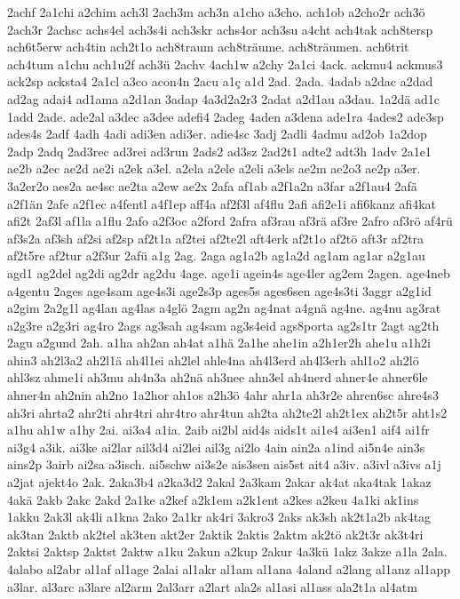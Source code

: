 {2achf
2a1chi
a2chim
ach3l
2ach3m
ach3n
a1cho
a3cho.
ach1ob
a2cho2r
ach3ö
2ach3r
2achsc
achs4el
ach3s4i
ach3skr
achs4or
ach3su
a4cht
ach4tak
ach8tersp
ach6t5erw
ach4tin
ach2t1o
ach8traum
ach8träume.
ach8träumen.
ach6trit
ach4tum
a1chu
ach1u2f
ach3ü
2achv
4ach1w
a2chy
2a1ci
4ack.
ackmu4
ackmus3
ack2sp
acksta4
2a1cl
a3co
acon4n
2acu
a1ç
a1d
2ad.
2ada.
4adab
a2dac
a2dad
ad2ag
adai4
ad1ama
a2d1an
3adap
4a3d2a2r3
2adat
a2d1au
a3dau.
1a2dä
ad1c
1add
2ade.
ade2al
a3dec
a3dee
adefi4
2adeg
4aden
a3dena
ade1ra
4ades2
ade3sp
ades4s
2adf
4adh
4adi
adi3en
adi3er.
adie4sc
3adj
2adli
4admu
ad2ob
1a2dop
2adp
2adq
2ad3rec
ad3rei
ad3run
2ads2
ad3sz
2ad2t1
adte2
adt3h
1adv
2a1e1
ae2b
a2ec
ae2d
ae2i
a2ek
a3el.
a2ela
a2ele
a2eli
a3els
ae2m
ae2o3
ae2p
a3er.
3a2er2o
aes2a
ae4sc
ae2ta
a2ew
ae2x
2afa
af1ab
a2f1a2n
a3far
a2f1au4
2afä
a2f1än
2afe
a2f1ec
a4fentl
a4f1ep
aff4a
af2f3l
af4flu
2afi
afi2e1i
afi6kanz
afi4kat
afi2t
2af3l
af1la
a1flu
2afo
a2f3oc
a2ford
2afra
af3rau
af3rä
af3re
2afro
af3rö
af4rü
af3s2a
af3sh
af2si
af2sp
af2t1a
af2tei
af2te2l
aft4erk
af2t1o
af2tö
aft3r
af2tra
af2t5re
af2tur
a2f3ur
2afü
a1g
2ag.
2aga
ag1a2b
ag1a2d
ag1am
ag1ar
a2g1au
agd1
ag2del
ag2di
ag2dr
ag2du
4age.
age1i
agein4s
age4ler
ag2em
2agen.
age4neb
a4gentu
2ages
age4sam
age4s3i
age2s3p
ages5s
ages6sen
age4s3ti
3aggr
a2g1id
a2gim
2a2g1l
ag4lan
ag4las
a4glö
2agm
ag2n
ag4nat
a4gnä
ag4ne.
ag4nu
ag3rat
a2g3re
a2g3ri
ag4ro
2ags
ag3sah
ag4sam
ag3s4eid
ags8porta
ag2s1tr
2agt
ag2th
2agu
a2gund
2ah.
a1ha
ah2an
ah4at
a1hä
2a1he
ahe1in
a2h1er2h
ahe1u
a1h2i
ahin3
ah2l3a2
ah2l1ä
ah4l1ei
ah2lel
ahle4na
ah4l3erd
ah4l3erh
ahl1o2
ah2lö
ahl3sz
ahme1i
ah3mu
ah4n3a
ah2nä
ah3nee
ahn3el
ah4nerd
ahner4e
ahner6le
ahner4n
ah2nin
ah2no
1a2hor
ah1os
a2h3ö
4ahr
ahr1a
ah3r2e
ahren6sc
ahre4s3
ah3ri
ahrta2
ahr2ti
ahr4tri
ahr4tro
ahr4tun
ah2ta
ah2te2l
ah2t1ex
ah2t5r
aht1s2
a1hu
ah1w
a1hy
2ai.
ai3a4
a1ia.
2aib
ai2bl
aid4s
aids1t
ai1e4
ai3en1
aif4
ai1fr
ai3g4
a3ik.
ai3ke
ai2lar
ail3d4
ai2lei
ail3g
ai2lo
4ain
ain2a
a1ind
ai5n4e
ain3s
ains2p
3airb
ai2sa
a3isch.
ai5schw
ai3s2e
ais3sen
ais5st
ait4
a3iv.
a3ivl
a3ivs
a1j
a2jat
ajekt4o
2ak.
2aka3b4
a2ka3d2
2akal
2a3kam
2akar
ak4at
aka4tak
1akaz
4akä
2akb
2akc
2akd
2a1ke
a2kef
a2k1em
a2k1ent
a2kes
a2keu
4a1ki
ak1ins
1akku
2ak3l
ak4li
a1kna
2ako
2a1kr
ak4ri
3akro3
2aks
ak3sh
ak2t1a2b
ak4tag
ak3tan
2aktb
ak2tel
ak3ten
akt2er
2aktik
2aktis
2aktm
ak2tö
ak2t3r
ak3t4ri
2aktsi
2aktsp
2aktst
2aktw
a1ku
2akun
a2kup
2akur
4a3kü
1akz
3akze
a1la
2ala.
4alabo
al2abr
al1af
al1age
2alai
al1akr
al1am
al1ana
4aland
a2lang
al1anz
al1app
a3lar.
al3arc
a3lare
al2arm
2al3arr
a2lart
ala2s
al1asi
al1ass
ala2t1a
al4atm
}
